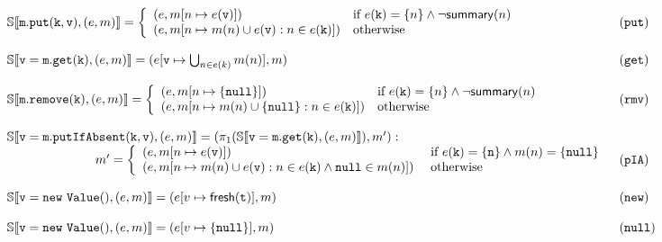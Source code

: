\begin{figure*}
\[
\begin{array}{ll}
\mathbb{S}\llbracket \mathtt{m.put(k, v)}, (e, m) \rrbracket = \left\{
\begin{array}{ll}
(e, m[n \mapsto e(\mathtt{v})]) & \textrm{if } e(\mathtt{k})=\{n\} \land \neg \mathsf{summary}(n)\\
(e, m[n \mapsto m(n) \cup e(\mathtt{v}) : n \in e(\mathtt{k})]) & \textrm{otherwise}\\
\end{array}
\right. & (\mathtt{put})\\
\\
\mathbb{S}\llbracket \mathtt{v=m.get(k)}, (e, m) \rrbracket = (e[\mathtt{v} \mapsto \bigcup_{n \in e(k)} m(n)], m) & (\mathtt{get})\\
\\
\mathbb{S}\llbracket \mathtt{m.remove(k)}, (e, m) \rrbracket =  \left\{
\begin{array}{ll}
(e, m[n \mapsto \{\mathtt{null}\}]) & \textrm{if } e(\mathtt{k})=\{n\} \land \neg \mathsf{summary}(n)\\
(e, m[n \mapsto m(n) \cup \{\mathtt{null}\} : n \in e(\mathtt{k})]) & \textrm{otherwise}\\
\end{array}
\right. & (\mathtt{rmv})\\ 
\\
\mathbb{S}\llbracket \mathtt{v = m.putIfAbsent(k, v)}, (e, m) \rrbracket =  (\pi_1(\mathbb{S}\llbracket \mathtt{v = m.get(k)}, (e, m) \rrbracket), m') : & \\
\hspace{70pt} 
m'=
\left\{
\begin{array}{ll}
(e, m[n \mapsto e(\mathtt{v})]) & \textrm{ if } e(\mathtt{k})=\{\mathtt{n}\} \land m(n) = \{\mathtt{null}\}\\
(e, m[n \mapsto m(n) \cup e(\mathtt{v}) : n \in e(\mathtt{k}) \land \mathtt{null} \in m(n)]) & \textrm{ otherwise}\\
\end{array}
\right. & (\mathtt{pIA})\\
\\
\mathbb{S}\llbracket \mathtt{v = new\ Value()}, (e, m) \rrbracket =  (e[v \mapsto \mathsf{fresh}(\mathtt{t})], m)& (\mathtt{new})\\
\\
\mathbb{S}\llbracket \mathtt{v = new\ Value()}, (e, m) \rrbracket =  (e[v \mapsto \{\mathtt{null}\}], m)& (\mathtt{null})\\
\\

\end{array}\]
\end{figure*}

